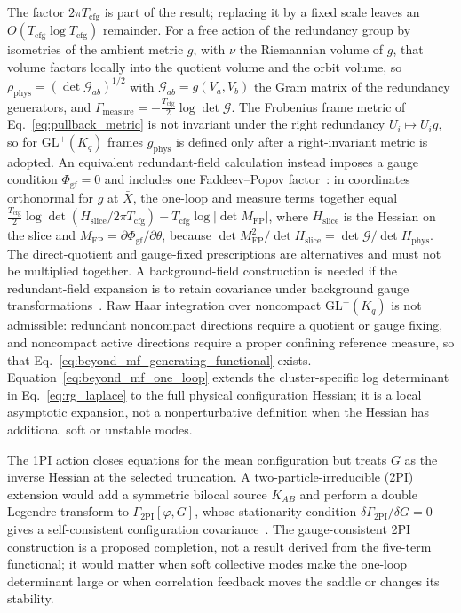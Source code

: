 The factor $2\pi T_{\mathrm{cfg}}$ is part of the result; replacing it by a fixed scale leaves an $O(T_{\mathrm{cfg}}\log T_{\mathrm{cfg}})$ remainder. For a free action of the redundancy group by isometries of the ambient metric $g$, with $\nu$ the Riemannian volume of $g$, that volume factors locally into the quotient volume and the orbit volume, so $\rho_{\mathrm{phys}}=(\det\mathcal{G}_{ab})^{1/2}$ with $\mathcal{G}_{ab}=g(V_a,V_b)$ the Gram matrix of the redundancy generators, and $\Gamma_{\mathrm{measure}}=-\frac{T_{\mathrm{cfg}}}{2}\log\det\mathcal{G}$. The Frobenius frame metric of Eq.~\eqref{eq:pullback_metric} is not invariant under the right redundancy $U_i\mapsto U_ig$, so for $\mathrm{GL}^+(K_q)$ frames $g_{\mathrm{phys}}$ is defined only after a right-invariant metric is adopted. An equivalent redundant-field calculation instead imposes a gauge condition $\Phi_{\mathrm{gf}}=0$ and includes one Faddeev--Popov factor~\cite{FaddeevPopov1967}: in coordinates orthonormal for $g$ at $\bar{X}$, the one-loop and measure terms together equal $\frac{T_{\mathrm{cfg}}}{2}\log\det(H_{\mathrm{slice}}/2\pi T_{\mathrm{cfg}})-T_{\mathrm{cfg}}\log|\det M_{\mathrm{FP}}|$, where $H_{\mathrm{slice}}$ is the Hessian on the slice and $M_{\mathrm{FP}}=\partial\Phi_{\mathrm{gf}}/\partial\theta$, because $\det M_{\mathrm{FP}}^2/\det H_{\mathrm{slice}}=\det\mathcal{G}/\det H_{\mathrm{phys}}$. The direct-quotient and gauge-fixed prescriptions are alternatives and must not be multiplied together. A background-field construction is needed if the redundant-field expansion is to retain covariance under background gauge transformations~\cite{DeWitt1967,Abbott1981,Abbott1982}. Raw Haar integration over noncompact $\mathrm{GL}^+(K_q)$ is not admissible: redundant noncompact directions require a quotient or gauge fixing, and noncompact active directions require a proper confining reference measure, so that Eq.~\eqref{eq:beyond_mf_generating_functional} exists. Equation~\eqref{eq:beyond_mf_one_loop} extends the cluster-specific log determinant in Eq.~\eqref{eq:rg_laplace} to the full physical configuration Hessian; it is a local asymptotic expansion, not a nonperturbative definition when the Hessian has additional soft or unstable modes.

The 1PI action closes equations for the mean configuration but treats $G$ as the inverse Hessian at the selected truncation. A two-particle-irreducible (2PI) extension would add a symmetric bilocal source $K_{AB}$ and perform a double Legendre transform to $\Gamma_{\mathrm{2PI}}[\varphi,G]$, whose stationarity condition $\delta\Gamma_{\mathrm{2PI}}/\delta G=0$ gives a self-consistent configuration covariance~\cite{CornwallJackiwTomboulis1974}. The gauge-consistent 2PI construction is a proposed completion, not a result derived from the five-term functional; it would matter when soft collective modes make the one-loop determinant large or when correlation feedback moves the saddle or changes its stability.

